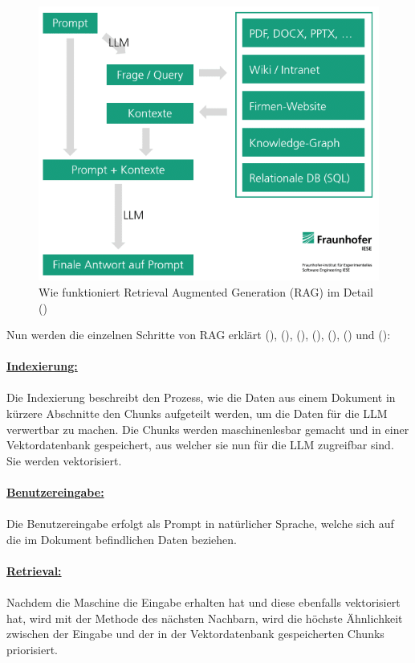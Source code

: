 \documentclass[12pt,toc=bib,toc=listof]{scrreprt}
\begin{document}
\begin{figure} [H]
    \centering
    \includegraphics[width=0.75\linewidth]{./Bilder/Honroth_Wie funktioniert Retrieval Augmented Generation (RAG) im Detail.png}
    \caption{Wie funktioniert Retrieval Augmented Generation (RAG) im Detail (\cite{Honroth2024})}
    \label{fig:enter-label}
\end{figure}
\noindent Nun werden die einzelnen Schritte von RAG erklärt (\cite{Gao2024}), (\cite{Honroth2024}), (\cite{Lewis2021}), (\cite{Miesle2023}), (\cite{Salemi2024}), (\cite{Schmid2024}) und (\cite{Wu2024}):\\
\\
\textbf{\underline{Indexierung:}}\\
\\
Die Indexierung beschreibt den Prozess, wie die Daten aus einem Dokument in kürzere Abschnitte den Chunks aufgeteilt werden, um die Daten für die LLM verwertbar zu machen. Die Chunks werden maschinenlesbar gemacht und in einer Vektordatenbank gespeichert, aus welcher sie nun für die LLM zugreifbar sind. Sie werden vektorisiert.\\
\\
\textbf{\underline{Benutzereingabe:}}\\
\\
Die Benutzereingabe erfolgt als Prompt in natürlicher Sprache, welche sich auf die im Dokument befindlichen Daten beziehen.\\
\\
\textbf{\underline{Retrieval:}}\\
\\
Nachdem die Maschine die Eingabe erhalten hat und diese ebenfalls vektorisiert hat, wird mit der Methode des nächsten Nachbarn, wird die höchste Ähnlichkeit zwischen der Eingabe und der in der Vektordatenbank gespeicherten Chunks priorisiert.\\
\end{document}
